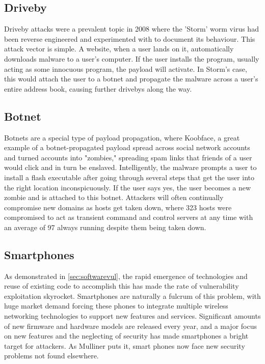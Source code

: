 \documentclass[a4paper, 11pt]{article}
\begin{document}
\subsection{Driveby}
\label{sec:driveby}
Driveby attacks were a prevalent topic in 2008 \cite{ref:kanich2008spamalytics} where the 'Storm' worm virus had been reverse engineered and experimented with to document its behaviour. This attack vector is simple. A website, when a user lands on it, automatically downloads malware to a user's computer. If the user installs the program, usually acting as some innocuous program, the payload will activate. In Storm's case, this would attach the user to a botnet and propagate the malware across a user's entire address book, causing further drivebys along the way.

\subsection{Botnet}
\label{sec:botnet}
Botnets are a special type of payload propagation, where Koobface, a great example of a botnet-propagated payload spread across social network accounts and turned accounts into "zombies," spreading spam links that friends of a user would click and in turn be enslaved. \cite{ref:thomas2010koobface} Intelligently, the malware prompts a user to install a flash executable after going through several steps that get the user into the right location inconspicuously. If the user says yes, the user becomes a new zombie and is attached to this botnet. Attackers will often continually compromise new domains as hosts get taken down, where 323 hosts were compromised to act as transient command and control servers at any time with an average of 97 always running despite them being taken down.

\subsection{Smartphones}
\label{sec:smartphones}
As demonstrated in \ref{sec:softwarevul}, the rapid emergence of technologies and reuse of existing code to accomplish this has made the rate of vulnerability exploitation skyrocket. \cite{ref:jang2014survey} Smartphones are naturally a fulcrum of this problem, with huge market demand forcing these phones to integrate multiple wireless networking technologies to support new features and services. \cite{ref:mulliner2006security} Significant amounts of new firmware and hardware models are released every year, and a major focus on new features and the neglecting of security has made smartphones a bright target for attackers. \cite{ref:mulliner2006security} As Mulliner \cite{ref:mulliner2006security} puts it, smart phones now face new security problems not found elsewhere.
\end{document}
